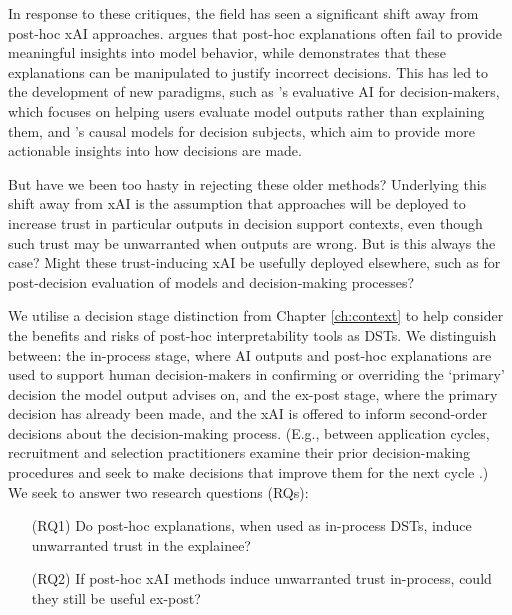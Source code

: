 
In response to these critiques, the field has seen a significant shift away from post-hoc xAI approaches. \textcite{kumar_problems_2020} argues that post-hoc explanations often fail to provide meaningful insights into model behavior, while \textcite{Bastounis_Campodonico_vanderSchaar_Adcock_Hansen_2024} demonstrates that these explanations can be manipulated to justify incorrect decisions. This has led to the development of new paradigms, such as \textcite{miller_explainable_2023}'s evaluative AI for decision-makers, which focuses on helping users evaluate model outputs rather than explaining them, and \textcite{karimi_algorithmic_2021}'s causal models for decision subjects, which aim to provide more actionable insights into how decisions are made.

But have we been too hasty in rejecting these older methods? Underlying this shift away from xAI is the assumption that approaches will be deployed to increase trust in particular outputs in decision support contexts, even though such trust may be unwarranted when outputs are wrong. But is this always the case? Might these trust-inducing xAI be usefully deployed elsewhere, such as for post-decision evaluation of models and decision-making processes?

We utilise a decision stage distinction from Chapter \ref{ch:context} to help consider the benefits and risks of post-hoc interpretability tools as DSTs. We distinguish between: the in-process stage, where AI outputs and post-hoc explanations are used to support human decision-makers in confirming or overriding the `primary' decision the model output advises on, and the ex-post stage, where the primary decision has already been made, and the xAI is offered to inform second-order decisions about the decision-making process. (E.g., between application cycles, recruitment and selection practitioners examine their prior decision-making procedures and seek to make decisions that improve them for the next cycle \cite{li2020hiring}.) We seek to answer two research questions (RQs):

\begin{enumerate}
    \item[(RQ1)] Do post-hoc explanations, when used as in-process DSTs, induce unwarranted trust in the explainee?
    \item[(RQ2)] If post-hoc xAI methods induce unwarranted trust in-process, could they still be useful ex-post?
\end{enumerate}

